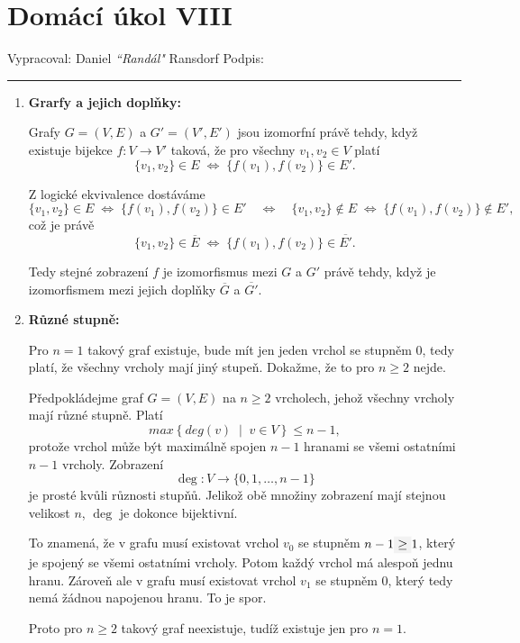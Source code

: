 \documentclass[12pt]{article}
\begin{document}
\section*{Domácí úkol VIII}

Vypracoval: Daniel \textit{``Randál"} Ransdorf \hfill Podpis: \rule{4cm}{0.4pt}

\begin{enumerate}
  
  \item \textbf{Grarfy a jejich doplňky:}
  
    Grafy $G = (V,E)$ a $G' = (V',E')$ jsou izomorfní právě tehdy, když existuje bijekce
    $f : V \to V'$ taková, že pro všechny $v_1,v_2 \in V$ platí
    \[
    \{v_1,v_2\} \in E \;\Leftrightarrow\; \{f(v_1),f(v_2)\} \in E'.
    \]

    Z logické ekvivalence dostáváme
    \[
    \{v_1,v_2\} \in E \;\Leftrightarrow\; \{f(v_1),f(v_2)\} \in E'
    \quad\Longleftrightarrow\quad
    \{v_1,v_2\} \notin E \;\Leftrightarrow\; \{f(v_1),f(v_2)\} \notin E',
    \]
    což je právě
    \[
    \{v_1,v_2\} \in \overline{E}
    \;\Leftrightarrow\;
    \{f(v_1),f(v_2)\} \in \overline{E'}.
    \]

    Tedy stejné zobrazení $f$ je izomorfismus mezi $G$ a $G'$ právě tehdy, když je izomorfismem 
    mezi jejich doplňky $\overline{G}$ a $\overline{G'}$. 

  \item \textbf{Různé stupně:}
  
    Pro $n=1$ takový graf existuje, bude mít jen jeden vrchol se stupněm $0$, tedy platí, že všechny
    vrcholy mají jiný stupeň. Dokažme, že to pro $n\ge2$ nejde.

    Předpokládejme graf $G = (V,E)$ na \colorbox{suddenblue}{$n \geq 2$} vrcholech, jehož všechny vrcholy mají různé stupně.
    Platí 
    \[max \left\{deg(v) \;\middle|\; v \in V \right\} \leq n-1,\]
    protože vrchol může být maximálně spojen $n-1$ hranami se všemi ostatními $n-1$ vrcholy.
    Zobrazení
    \[
    \deg : V \to \{0,1,\dots,n-1\}
    \]
    je prosté kvůli různosti stupňů. Jelikož obě množiny zobrazení mají stejnou velikost $n$, $\deg$ je dokonce bijektivní.
    
    To znamená, že v grafu musí existovat vrchol $v_0$ se stupněm $n-1 \colorbox{suddenblue}{$\geq $}1$, který je spojený se všemi
    ostatními vrcholy. Potom každý vrchol má alespoň jednu hranu.
    Zároveň ale v grafu musí existovat vrchol $v_1$ se stupněm $0$, který
    tedy nemá žádnou napojenou hranu. To je spor.
    
    Proto pro $n \geq 2$ takový graf neexistuje, tudíž existuje jen pro $n=1$.

\end{enumerate}
\end{document}
